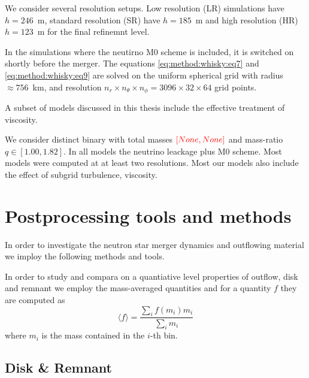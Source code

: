 We consider several resolution setups. Low resolution (LR) simulations have $h=246$~m, standard resolution (SR) 
have $h=185$~m and high resolution (HR) $h=123$~m for the final refinemnt level.

In the simulations where the neutirno M0 scheme is included, it is switched on shortly before the merger. 
The equations \eqref{eq:method:whisky:eq7} and \eqref{eq:method:whisky:eq9} are solved on the uniform spherical grid
with radius $\approx 756$~km, and resolution $n_r\times n_{\theta}\times n_{\phi} = 3096 \times 32 \times 64$
grid points.

A subset of models discussed in this thesis include the effective treatment of viscosity. 

We consider  distinct binary with total masses $\textcolor{red}{[None,None]}$ and mass-ratio $q\in[1.00,1.82]$.
In all models the neutrino leackage plus M0 scheme. Most models were computed at at least two resolutions. 
Most our models also include the effect of subgrid turbulence, viscosity.







\section{Postprocessing tools and methods}


In order to investigate the neutron star merger dynamics and outflowing material we imploy the following methods and tools.

In order to study and compara on a quantiative level properties of outflow, disk and remnant we employ the mass-averaged quantities and for a quantity $f$ they are computed as 
\begin{equation}
\langle f \rangle = \frac{\sum_i f(m_i)m_i}{\sum_i m_i}
\end{equation}
where $m_i$ is the mass contained in the $i$-th bin.


\subsection{Disk \& Remnant}


